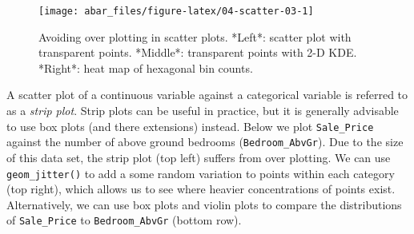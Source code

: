 \documentclass[]{book}
\theoremstyle{definition}
\theoremstyle{definition}
\theoremstyle{definition}
\theoremstyle{remark}
\begin{document}
\begin{figure}

{\centering \texttt{[image: abar\_files/figure-latex/04-scatter-03-1]} 

}

\caption{Avoiding over plotting in scatter plots. *Left*: scatter plot with transparent points. *Middle*: transparent points with 2-D KDE. *Right*: heat map of hexagonal bin counts.}\label{fig:04-scatter-03}
\end{figure}

A scatter plot of a continuous variable against a categorical variable
is referred to as a \emph{strip plot}. Strip plots can be useful in
practice, but it is generally advisable to use box plots (and there
extensions) instead. Below we plot \texttt{Sale\_Price} against the
number of above ground bedrooms (\texttt{Bedroom\_AbvGr}). Due to the
size of this data set, the strip plot (top left) suffers from over
plotting. We can use \texttt{geom\_jitter()} to add a some random
variation to points within each category (top right), which allows us to
see where heavier concentrations of points exist. Alternatively, we can
use box plots and violin plots to compare the distributions of
\texttt{Sale\_Price} to \texttt{Bedroom\_AbvGr} (bottom row).
\end{document}
